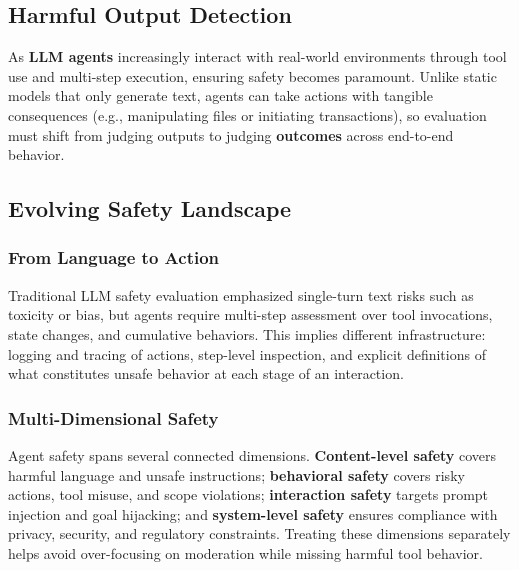 
\begin{TNtwocol}
\section{Harmful Output Detection}
\label{sec:harmful-output-detection}


As \textbf{LLM agents} increasingly interact with real-world environments through tool use and multi-step execution, ensuring safety becomes paramount. Unlike static models that only generate text, agents can take actions with tangible consequences (e.g., manipulating files or initiating transactions), so evaluation must shift from judging outputs to judging \textbf{outcomes} across end-to-end behavior.

\subsection*{Evolving Safety Landscape}

\subsubsection*{From Language to Action}
Traditional LLM safety evaluation emphasized single-turn text risks such as toxicity or bias, but agents require multi-step assessment over tool invocations, state changes, and cumulative behaviors. This implies different infrastructure: logging and tracing of actions, step-level inspection, and explicit definitions of what constitutes unsafe behavior at each stage of an interaction.

\subsubsection*{Multi-Dimensional Safety}
Agent safety spans several connected dimensions. \textbf{Content-level safety} covers harmful language and unsafe instructions; \textbf{behavioral safety} covers risky actions, tool misuse, and scope violations; \textbf{interaction safety} targets prompt injection and goal hijacking; and \textbf{system-level safety} ensures compliance with privacy, security, and regulatory constraints. Treating these dimensions separately helps avoid over-focusing on moderation while missing harmful tool behavior.


\end{TNtwocol}

